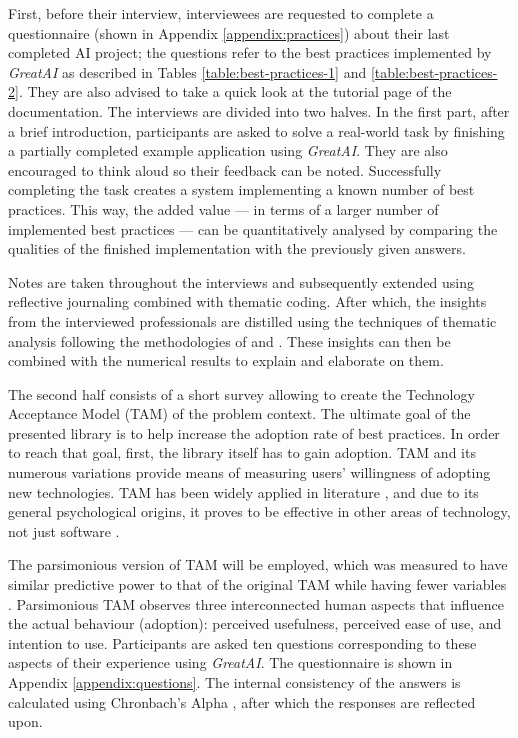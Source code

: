 First, before their interview, interviewees are requested to complete a questionnaire (shown in Appendix \ref{appendix:practices}) about their last completed AI project; the questions refer to the best practices implemented by \textit{GreatAI} as described in Tables \ref{table:best-practices-1} and \ref{table:best-practices-2}. They are also advised to take a quick look at the tutorial page of the documentation. The interviews are divided into two halves. In the first part, after a brief introduction, participants are asked to solve a real-world task by finishing a partially completed example application using \textit{GreatAI}. They are also encouraged to think aloud so their feedback can be noted. Successfully completing the task creates a system implementing a known number of best practices. This way, the added value --- in terms of a larger number of implemented best practices --- can be quantitatively analysed by comparing the qualities of the finished implementation with the previously given answers. 

Notes are taken throughout the interviews and subsequently extended using reflective journaling \cite{halcomb2006verbatim} combined with thematic coding. After which, the insights from the interviewed professionals are distilled using the techniques of thematic analysis \cite{fereday2006demonstrating} following the methodologies of \cite{cruz2019catalog} and \cite{haakman2021ai}. These insights can then be combined with the numerical results to explain and elaborate on them. 

The second half consists of a short survey allowing to create the Technology Acceptance Model (TAM) \cite{davis1989perceived} of the problem context. The ultimate goal of the presented library is to help increase the adoption rate of best practices. In order to reach that goal, first, the library itself has to gain adoption. TAM and its numerous variations provide means of measuring users' willingness of adopting new technologies. TAM has been widely applied in literature \cite{marangunic2015technology}, and due to its general psychological origins, it proves to be effective in other areas of technology, not just software \cite{riemenschneider2002explaining}. 

The parsimonious version of TAM will be employed, which was measured to have similar predictive power to that of the original TAM while having fewer variables \cite{wu2011user}. Parsimonious TAM observes three interconnected human aspects that influence the actual behaviour (adoption): perceived usefulness, perceived ease of use, and intention to use. Participants are asked ten questions corresponding to these aspects of their experience using \textit{GreatAI}. The questionnaire is shown in Appendix \ref{appendix:questions}. The internal consistency of the answers is calculated using Chronbach's Alpha \cite{bland1997statistics}, after which the responses are reflected upon.
